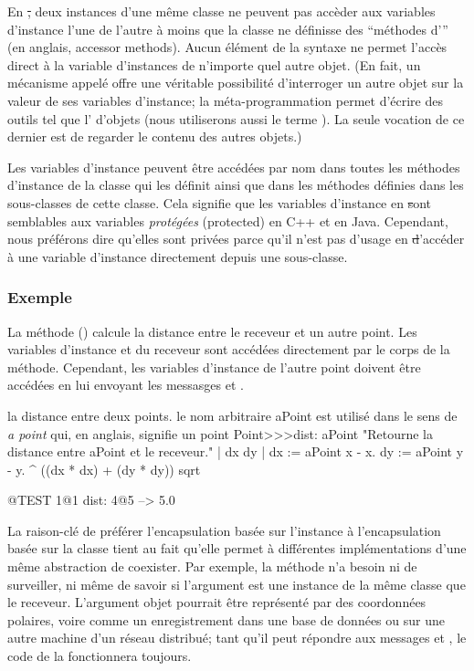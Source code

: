 \documentclass[a4paper,10pt,twoside]{book}
\begin{document}
En \st, deux instances d'une m\^eme classe ne peuvent pas acc\`eder aux variables d'instance l'une de l'autre \`a moins que la classe ne d\'efinisse des ``m\'ethodes d''' (en anglais, accessor methods).
Aucun \'el\'ement de la syntaxe ne permet l'acc\`es direct \`a la variable d'instances de n'importe quel autre objet.
(En fait, un m\'ecanisme appel\'e 
offre une v\'eritable possibilit\'e d'interroger un autre objet sur la valeur de ses variables d'instance; la m\'eta-programmation permet d'\'ecrire des outils tel que l' d'objets (nous utiliserons aussi le terme ). La seule vocation de ce dernier est de regarder le contenu des autres objets.)

Les variables d'instance peuvent \^etre acc\'ed\'ees par 
nom dans toutes les m\'ethodes d'instance de la classe qui les d\'efinit
ainsi que dans les m\'ethodes d\'efinies dans les sous-classes de cette classe.
Cela signifie que les variables d'instance en \st sont semblables aux
variables \emph{prot\'eg\'ees} (protected) en C++ et en Java. Cependant,
nous pr\'ef\'erons dire qu'elles sont priv\'ees parce qu'il n'est pas d'usage en \st d'acc\'eder \`a une variable d'instance directement depuis une sous-classe. 
\subsubsection{Exemple}
La m\'ethode  () calcule la distance entre le receveur et un autre point. Les variables d'instance  et  du receveur sont acc\'ed\'ees directement par le corps de la m\'ethode. Cependant, les variables d'instance de l'autre point doivent \^etre acc\'ed\'ees en lui envoyant les messasges  et .

\begin{method}[dist:]{la distance entre deux points. le nom arbitraire aPoint est utilis\'e dans le sens de \emph{a point} qui, en anglais, signifie un point}
Point>>>dist: aPoint 
	"Retourne la distance entre aPoint et le receveur."
	| dx dy |
	dx := aPoint x - x.
	dy :=  aPoint y - y.
	^ ((dx * dx) + (dy * dy)) sqrt
\end{method}

\begin{code}{@TEST}
1@1 dist: 4@5 --> 5.0
\end{code}

La raison-cl\'e de pr\'ef\'erer l'encapsulation bas\'ee sur l'instance
\`a l'encapsulation bas\'ee sur la classe tient au fait qu'elle permet
\`a diff\'erentes impl\'ementations d'une m\^eme abstraction de coexister.
Par exemple, la m\'ethode  n'a besoin ni de surveiller, ni 
m\^eme de savoir si l'argument  est une instance de la m\^eme classe
que le receveur.  L'argument objet pourrait \^etre repr\'esent\'e par des
coordonn\'ees polaires, voire comme un enregistrement dans une base de donn\'ees ou sur une autre machine d'un r\'eseau distribu\'e; tant qu'il peut r\'epondre
aux messages  et , le code de la  fonctionnera toujours.
\end{document}
